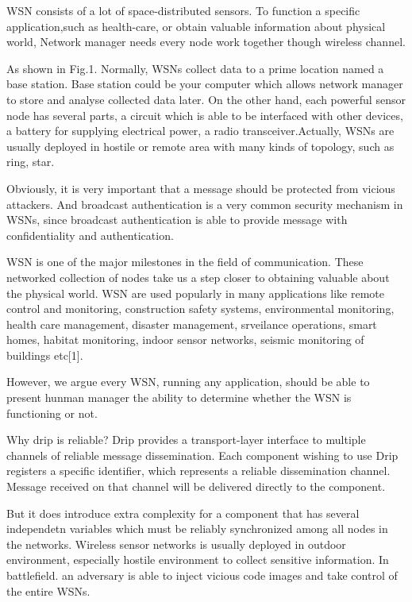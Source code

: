 \documentclass[lnicst,sechang,a4paper]{svmultln}
\begin{document}
WSN consists of a lot of space-distributed sensors. To function a specific application,such as health-care, or obtain valuable information about physical world, Network manager needs every node work together though wireless channel.

As shown in Fig.1. Normally, WSNs collect data to a prime location named a base station. Base station could be your computer which allows network manager to store and analyse collected data later. On the other hand, each powerful sensor node has several parts, a circuit which is able to be interfaced with other devices, a battery for supplying electrical power, a radio transceiver.Actually, WSNs are usually deployed in hostile or remote area with many kinds of topology, such as ring, star. 

Obviously, it is very important that a message should be protected from vicious attackers. And broadcast authentication is a very common security mechanism in WSNs, since broadcast authentication is able to provide message with confidentiality and authentication. 

WSN is one of the major milestones in the field of communication. These networked collection of nodes take us a step closer to obtaining valuable about the physical world. WSN are used popularly in many applications like remote control and monitoring, construction safety systems, environmental monitoring, health care management, disaster management, srveilance operations, smart homes, habitat monitoring, indoor sensor networks, seismic monitoring of buildings etc[1].

However, we argue every WSN, running any application, should be able to present hunman manager the ability to determine whether the WSN is functioning or not.

Why drip is reliable?
Drip provides a transport-layer interface to multiple channels of reliable message dissemination. Each component wishing to use Drip registers a specific identifier, which represents a reliable dissemination channel. Message received on that channel will be delivered directly to the component.

But it does introduce extra complexity for a component that has several independetn variables which must be reliably synchronized among all nodes in the networks.
Wireless sensor networks is usually deployed in outdoor environment, especially hostile environment to collect sensitive information. In battlefield. an adversary is able to inject vicious code images and take control of the entire WSNs.
\end{document}
